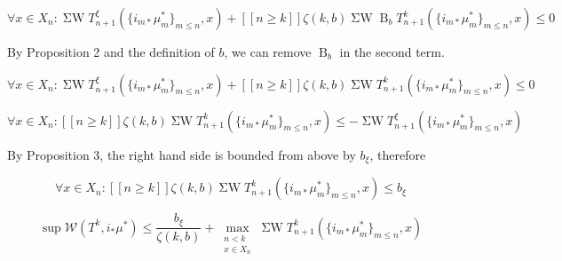 \documentclass[a4paper]{article}
\newcommand{\B}{\operatorname{B}_b}
\newcommand{\SW}{\operatorname{\Sigma W}}
\newcommand{\Wo}{\mathcal{W}}
\begin{document}
$$\forall x \in X_n: \SW T^\xi_{n+1}(\{i_{m*}\mu^*_m\}_{m \leq n}, x) + [[n \geq k]] \zeta(k,b)  \SW \B T^k_{n+1}(\{i_{m*}\mu^*_m\}_{m \leq n}, x) \leq 0$$

By Proposition 2 and the definition of ${b}$, we can remove ${\B}$ in the second term.

$$\forall x \in X_n: \SW T^\xi_{n+1}(\{i_{m*}\mu^*_m\}_{m \leq n}, x) + [[n \geq k]] \zeta(k,b)  \SW T^k_{n+1}(\{i_{m*}\mu^*_m\}_{m \leq n}, x) \leq 0$$

$$\forall x \in X_n: [[n \geq k]] \zeta(k,b)  \SW T^k_{n+1}(\{i_{m*}\mu^*_m\}_{m \leq n}, x) \leq -\SW T^\xi_{n+1}(\{i_{m*}\mu^*_m\}_{m \leq n}, x)$$

By Proposition 3, the right hand side is bounded from above by ${b_\xi}$, therefore

$$\forall x \in X_n: [[n \geq k]] \zeta(k,b) \SW T^k_{n+1}(\{i_{m*}\mu^*_m\}_{m \leq n}, x) \leq b_\xi$$

$$\sup \Wo(T^k,i_* \mu^*) \leq \frac{b_\xi}{\zeta(k,b)} + \max_{\substack{n < k \\ x \in X_n}} \SW T^k_{n+1}(\{i_{m*}\mu^*_m\}_{m \leq n}, x)$$
\end{document}
